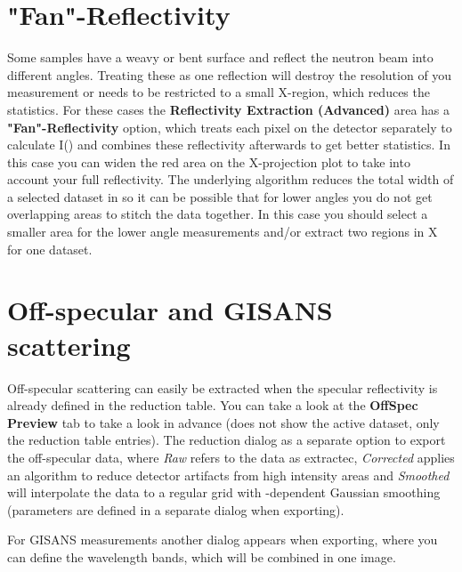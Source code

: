   \section{"Fan"-Reflectivity}
    Some samples have a weavy or bent surface and reflect the neutron beam into different angles. 
    Treating these as one reflection will destroy the \Qz resolution of you measurement or needs to be restricted to a small X-region, which reduces the statistics.
    For these cases the \textbf{Reflectivity Extraction (Advanced)} area has a \textbf{"Fan"-Reflectivity} option, which treats each pixel on the detector separately to calculate I(\Qz) and combines these reflectivity afterwards to get better statistics. 
    In this case you can widen the red area on the X-projection plot to take into account your full reflectivity.
    The underlying algorithm reduces the total width of a selected dataset in \Qz so it can be possible that for lower angles you do not get overlapping areas to stitch the data together.
    In this case you should select a smaller area for the lower angle measurements and/or extract two regions in X for one dataset.
  
  \section{Off-specular and GISANS scattering}
    Off-specular scattering can easily be extracted when the specular reflectivity is already defined in the reduction table. You can take a look at the \textbf{OffSpec Preview} tab to take a look in advance (does not show the active dataset, only the reduction table entries).
    The reduction dialog as a separate option to export the off-specular data, where \textit{Raw} refers to the data as extractec, \textit{Corrected} applies an algorithm to reduce detector artifacts from high intensity areas and \textit{Smoothed} will interpolate the data to a regular grid with \Qz-dependent Gaussian smoothing (parameters are defined in a separate dialog when exporting).
    
    For GISANS measurements another dialog appears when exporting, where you can define the wavelength bands, which will be combined in one image.
  
  
